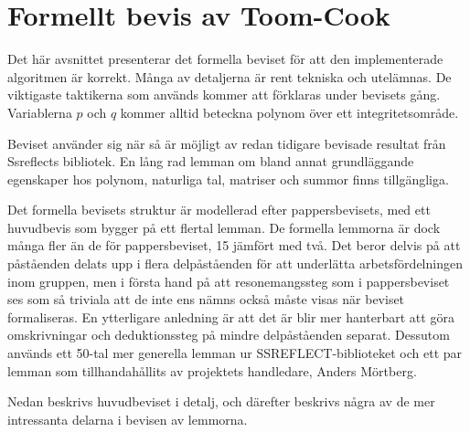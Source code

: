 \section{Formellt bevis av Toom-Cook}
\label{sec:formellbevis}
Det här avsnittet presenterar det formella beviset för att den implementerade
algoritmen är korrekt. Många av detaljerna är rent tekniska och utelämnas. De
viktigaste taktikerna som används kommer att förklaras under bevisets gång.
Variablerna $p$ och $q$ kommer alltid beteckna polynom över ett
integritetsområde.

Beviset använder sig när så är möjligt av redan tidigare bevisade resultat från
Ssreflects bibliotek. En lång rad lemman om bland annat grundläggande
egenskaper hos polynom, naturliga tal, matriser och summor finns tillgängliga.

Det formella bevisets struktur är modellerad efter pappersbevisets, med ett
huvudbevis som bygger på ett flertal lemman. De formella lemmorna är dock många
fler än de för pappersbeviset, 15 jämfört med två. Det beror delvis på att
påståenden delats upp i flera delpåståenden för att underlätta
arbetsfördelningen inom gruppen, men i första hand på att resonemangssteg som i
pappersbeviset ses som så triviala att de inte ens nämns också måste visas när
beviset formaliseras. En ytterligare anledning är att det är blir mer
hanterbart att göra omskrivningar och deduktionssteg på mindre delpåståenden
separat. Dessutom används ett 50-tal mer generella lemman ur
SSREFLECT-biblioteket och ett par lemman som tillhandahållits av projektets
handledare, Anders Mörtberg.

Nedan beskrivs huvudbeviset i detalj, och därefter beskrivs några av de mer
intressanta delarna i bevisen av lemmorna.

